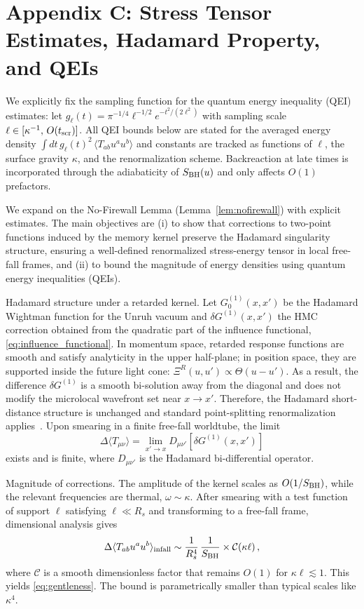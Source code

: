 \documentclass[a4paper,11pt]{article}
\newcommand{\HMC}{\textup{\textsc{HMC}}\xspace}
\theoremstyle{plain}
\theoremstyle{definition}
\theoremstyle{remark}
\begin{document}
\section{Appendix C: Stress Tensor Estimates, Hadamard Property, and QEIs}
\label{app:stress_tensor}
\label{app:qei-derivation}
We explicitly fix the sampling function for the quantum energy inequality (QEI) estimates:
let \(g_\ell(t)=\pi^{-1/4}\ell^{-1/2}e^{-t^2/(2\ell^2)}\) with sampling scale \(\ell\in[\kappa^{-1},\,O(t_{\rm scr})]\).
All QEI bounds below are stated for the averaged energy density \(\int dt\,g_\ell(t)^2\,\langle T_{ab}u^a u^b\rangle\)
and constants are tracked as functions of \(\ell\), the surface gravity \(\kappa\), and the renormalization scheme.
Backreaction at late times is incorporated through the adiabaticity of \(S_{\rm BH}(u)\) and only affects \(O(1)\) prefactors.

We expand on the No-Firewall Lemma (Lemma~\ref{lem:nofirewall}) with explicit estimates. The main objectives are (i) to show that corrections to two-point functions induced by the memory kernel preserve the Hadamard singularity structure, ensuring a well-defined renormalized stress-energy tensor in local free-fall frames, and (ii) to bound the magnitude of energy densities using quantum energy inequalities (QEIs).

Hadamard structure under a retarded kernel. Let $G^{(1)}_0(x,x')$ be the Hadamard Wightman function for the Unruh vacuum and $\delta G^{(1)}(x,x')$ the \HMC{} correction obtained from the quadratic part of the influence functional, \eqref{eq:influence_functional}. In momentum space, retarded response functions are smooth and satisfy analyticity in the upper half-plane; in position space, they are supported inside the future light cone: $\Xi^R(u,u')\propto \Theta(u-u')$. As a result, the difference $\delta G^{(1)}$ is a smooth bi-solution away from the diagonal and does not modify the microlocal wavefront set near $x\to x'$. Therefore, the Hadamard short-distance structure is unchanged and standard point-splitting renormalization applies~\cite{Radzikowski:1996}. Upon smearing in a finite free-fall worldtube, the limit
\begin{equation}
\Delta\langle T_{\mu\nu}\rangle = \lim_{x'\to x} D_{\mu\nu'}\left[\delta G^{(1)}(x,x')\right]
\end{equation}
exists and is finite, where $D_{\mu\nu'}$ is the Hadamard bi-differential operator.

Magnitude of corrections. The amplitude of the kernel scales as $O(1/S_{\rm BH})$, while the relevant frequencies are thermal, $\omega\sim \kappa$. After smearing with a test function of support $\ell$ satisfying $\ell\ll R_s$ and transforming to a free-fall frame, dimensional analysis gives
\begin{equation}
\Delta\langle T_{ab}u^a u^b\rangle_{\rm infall} \sim \frac{1}{R_s^4}\,\frac{1}{S_{\rm BH}}\times \mathcal{C}(\kappa \ell)\,,
\end{equation}
where $\mathcal{C}$ is a smooth dimensionless factor that remains $O(1)$ for $\kappa\ell\lesssim 1$. This yields \eqref{eq:gentleness}. The bound is parametrically smaller than typical scales like $\kappa^4$.
\end{document}

